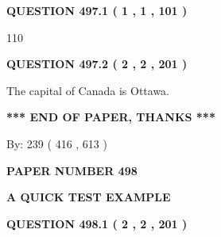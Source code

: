 \documentclass[12pt]{article}
\begin{document}
{\textbf{\Large{QUESTION
497.1 
 ( 1 , 1 , 101 )
}}}
  
  
 
 
\noindent{}

110
 
 
  
\vspace{0.2in}
  
{\textbf{\Large{QUESTION
497.2 
 ( 2 , 2 , 201 )
}}}
  
  
 
 
\noindent{}
 
 
The capital of Canada is Ottawa.
 
 
 
 
   
   
 \vspace{0.2in}
 
   
   
   
   
\vspace{1.0in} 
{\textbf{\large{ *** END OF PAPER, THANKS *** }}} 
   
   
\hspace{1.0in} By: 
 239 ( 416 ,  613 )
   
   
   
   
\newpage 
\setcounter{page}{ 
   498001 } 
   
   
   
   
 {\textbf{ \Large{ PAPER NUMBER  498  }}}
   
   
\vspace{0.2in}
   
   
   
   
   
   
 \vspace{0.2in}
{\LARGE {\textbf{ A QUICK TEST EXAMPLE}}}
   
   
  
\vspace{0.2in}
  
{\textbf{\Large{QUESTION
498.1 
 ( 2 , 2 , 201 )
}}}
  
  
 
 
\noindent{}
 
\end{document}

